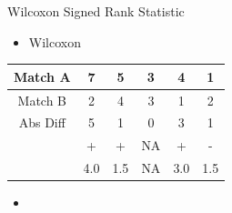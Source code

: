 \documentclass[ignorenonframetext,]{beamer}
\providecommand{\tightlist}{%
  \setlength{\itemsep}{0pt}\setlength{\parskip}{0pt}}
\begin{document}
\begin{frame}{Wilcoxon Signed Rank Statistic}

\begin{itemize}
\tightlist
\item
  Wilcoxon \color{red}{Signed} \color{blue}{Rank}
  \color{violet}{Statistic}
\end{itemize}

\small

\begin{center}
 \begin{tabular}{||c c c c c c||} 
 \hline
 Match A &  7 &  5 & 3 & 4 & 1  \\ 
 \hline
 Match B & 2 & 4 &  3 & 1 & 2  \\
 \hline\hline
 Abs Diff & 5 & 1 & 0 & 3 & 1  \\  
 \hline
 \color{red}{Sign} & + & + & NA & + & -  \\ 
 \hline
 \color{blue}{Rank} & 4.0 & 1.5 & NA & 3.0 & 1.5  \\ 
 \hline
\end{tabular}
\end{center}

\normalsize

\begin{itemize}
\tightlist
\item
\end{itemize}

\end{frame}
\end{document}

